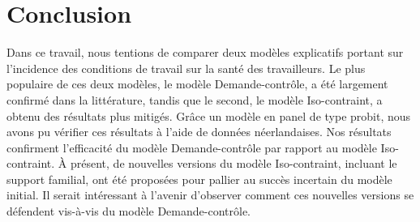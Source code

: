 \documentclass[a4paper, oneside, titlepage]{article}
\begin{document}
\section{Conclusion}
Dans ce travail, nous tentions de comparer deux modèles explicatifs portant sur l'incidence des conditions de travail sur la santé des travailleurs. Le plus populaire de ces deux modèles, le modèle Demande-contrôle, a été largement confirmé dans la littérature, tandis que le second, le modèle Iso-contraint, a obtenu des résultats plus mitigés. Grâce un modèle en panel de type probit, nous avons pu vérifier ces résultats à l'aide de données néerlandaises. Nos résultats confirment l'efficacité du modèle Demande-contrôle par rapport au modèle Iso-contraint. À présent, de nouvelles versions du modèle Iso-contraint, incluant le support familial, ont été proposées pour pallier au succès incertain du modèle initial. Il serait intéressant à l'avenir d'observer comment ces nouvelles versions se défendent vis-à-vis du modèle Demande-contrôle.

\newpage
\end{document}
